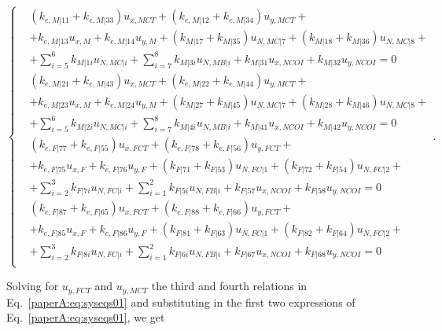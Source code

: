 \begin{equation}\label{paperA:eq:syseqs01}
\begin{cases}
&\left(k_{e,M|11}+k_{e,M|33}\right)u_{x,MCT}+\left(k_{e,M|12}+k_{e,M|34}\right)u_{y,MCT}+\\&+k_{e,M|13}u_{x,M}+k_{e,M|14}u_{y,M}+\left(k_{M|17}+k_{M|35}\right)u_{N,MC|7}+\left(k_{M|18}+k_{M|36}\right)u_{N,MC|8}+\\&+\sum_{i=5}^{6}k_{M|1i}u_{N,MC|i}+\sum_{i=7}^{8}k_{M|3i}u_{N,MB|i}+k_{M|31}u_{x,NCOI}+k_{M|32}u_{y,NCOI}=0\\[10pt]
&\left(k_{e,M|21}+k_{e,M|43}\right)u_{x,MCT}+\left(k_{e,M|22}+k_{e,M|44}\right)u_{y,MCT}+\\&+k_{e,M|23}u_{x,M}+k_{e,M|24}u_{y,M}+\left(k_{M|27}+k_{M|45}\right)u_{N,MC|7}+\left(k_{M|28}+k_{M|46}\right)u_{N,MC|8}+\\&+\sum_{i=5}^{6}k_{M|2i}u_{N,MC|i}+\sum_{i=7}^{8}k_{M|4i}u_{N,MB|i}+k_{M|41}u_{x,NCOI}+k_{M|42}u_{y,NCOI}=0\\[10pt]
&\left(k_{e,F|77}+k_{e,F|55}\right)u_{x,FCT}+\left(k_{e,F|78}+k_{e,F|56}\right)u_{y,FCT}+\\&+k_{e,F|75}u_{x,F}+k_{e,F|76}u_{y,F}+\left(k_{F|71}+k_{F|53}\right)u_{N,FC|1}+\left(k_{F|72}+k_{F|54}\right)u_{N,FC|2}+\\&+\sum_{i=2}^{3}k_{F|7i}u_{N,FC|i}+\sum_{i=1}^{2}k_{F|5i}u_{N,FB|i}+k_{F|57}u_{x,NCOI}+k_{F|58}u_{y,NCOI}=0\\[10pt]
&\left(k_{e,F|87}+k_{e,F|65}\right)u_{x,FCT}+\left(k_{e,F|88}+k_{e,F|66}\right)u_{y,FCT}+\\&+k_{e,F|85}u_{x,F}+k_{e,F|86}u_{y,F}+\left(k_{F|81}+k_{F|63}\right)u_{N,FC|1}+\left(k_{F|82}+k_{F|64}\right)u_{N,FC|2}+\\&+\sum_{i=2}^{3}k_{F|8i}u_{N,FC|i}+\sum_{i=1}^{2}k_{F|6i}u_{N,FB|i}+k_{F|67}u_{x,NCOI}+k_{F|68}u_{y,NCOI}=0\\[10pt]
\end{cases}.
\end{equation}

Solving for $u_{y,FCT}$ and $u_{y,MCT}$ the third and fourth relations in Eq.~\ref{paperA:eq:syseqs01} and substituting in the first two expressions of Eq.~\ref{paperA:eq:syseqs01}, we get

